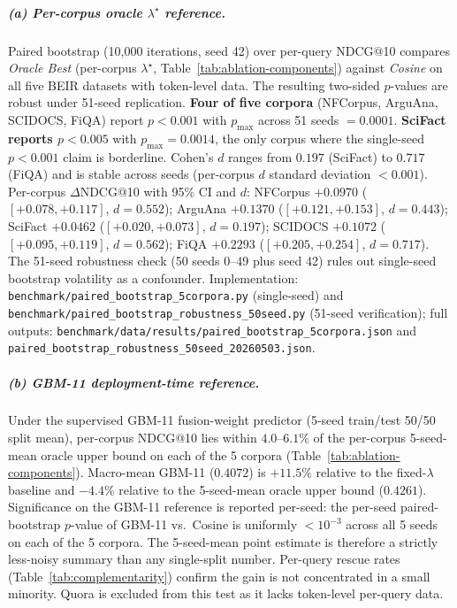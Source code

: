 \documentclass[review,1p]{elsarticle}
\begin{document}
\subparagraph{(a) Per-corpus oracle $\lambda^\star$ reference.} Paired bootstrap (10{,}000 iterations, seed 42) over per-query NDCG@10 compares \emph{Oracle Best} (per-corpus $\lambda^\star$, Table~\ref{tab:ablation-components}) against \emph{Cosine} on all five BEIR datasets with token-level data. The resulting two-sided $p$-values are robust under 51-seed replication. \textbf{Four of five corpora} (NFCorpus, ArguAna, SCIDOCS, FiQA) report $p < 0.001$ with $p_{\max}$ across 51 seeds $= 0.0001$. \textbf{SciFact reports $p < 0.005$} with $p_{\max} = 0.0014$, the only corpus where the single-seed $p < 0.001$ claim is borderline. Cohen's $d$ ranges from $0.197$ (SciFact) to $0.717$ (FiQA) and is stable across seeds (per-corpus $d$ standard deviation $< 0.001$). Per-corpus $\Delta$NDCG@10 with 95\% CI and $d$: NFCorpus $+0.0970$ ($[+0.078, +0.117]$, $d=0.552$); ArguAna $+0.1370$ ($[+0.121, +0.153]$, $d=0.443$); SciFact $+0.0462$ ($[+0.020, +0.073]$, $d=0.197$); SCIDOCS $+0.1072$ ($[+0.095, +0.119]$, $d=0.562$); FiQA $+0.2293$ ($[+0.205, +0.254]$, $d=0.717$). The 51-seed robustness check (50 seeds 0--49 plus seed 42) rules out single-seed bootstrap volatility as a confounder. Implementation: \texttt{benchmark/paired\_bootstrap\_5corpora.py} (single-seed) and \texttt{benchmark/paired\_bootstrap\_robustness\_50seed.py} (51-seed verification); full outputs: \texttt{benchmark/data/results/paired\_bootstrap\_5corpora.json} and \texttt{paired\_bootstrap\_robustness\_50seed\_20260503.json}.

\subparagraph{(b) GBM-11 deployment-time reference.} Under the supervised GBM-11 fusion-weight predictor (5-seed train/test 50/50 split mean), per-corpus NDCG@10 lies within $4.0$--$6.1\%$ of the per-corpus 5-seed-mean oracle upper bound on each of the 5 corpora (Table~\ref{tab:ablation-components}). Macro-mean GBM-11 ($0.4072$) is $+11.5\%$ relative to the fixed-$\lambda$ baseline and $-4.4\%$ relative to the 5-seed-mean oracle upper bound ($0.4261$). Significance on the GBM-11 reference is reported per-seed: the per-seed paired-bootstrap $p$-value of GBM-11 vs.\ Cosine is uniformly $<10^{-3}$ across all 5 seeds on each of the 5 corpora. The 5-seed-mean point estimate is therefore a strictly less-noisy summary than any single-split number. Per-query rescue rates (Table~\ref{tab:complementarity}) confirm the gain is not concentrated in a small minority. Quora is excluded from this test as it lacks token-level per-query data.
\end{document}
